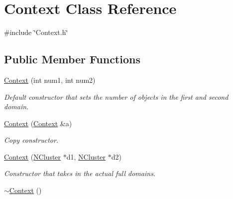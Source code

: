 \hypertarget{class_context}{
\section{Context Class Reference}
\label{class_context}
}


{\ttfamily \#include \char`\"{}Context.h\char`\"{}}

\subsection*{Public Member Functions}
\begin{DoxyCompactItemize}
\item 
\hyperlink{class_context_a7c09cf1cce283bf24fed475e7084c294}{Context} (int num1, int num2)
\begin{DoxyCompactList}\small\item\em Default constructor that sets the number of objects in the first and second domain. \item\end{DoxyCompactList}\item 
\hyperlink{class_context_ac0423f54b36186488e04d7723c52fee4}{Context} (\hyperlink{class_context}{Context} \&a)
\begin{DoxyCompactList}\small\item\em Copy constructor. \item\end{DoxyCompactList}\item 
\hyperlink{class_context_ae66f36043dcffe09e73765eed28eb782}{Context} (\hyperlink{class_n_cluster}{NCluster} $\ast$d1, \hyperlink{class_n_cluster}{NCluster} $\ast$d2)
\begin{DoxyCompactList}\small\item\em Constructor that takes in the actual full domains. \item\end{DoxyCompactList}\item 
\hypertarget{class_context_a2d34e4556448e40693f61d15e091b604}{
\hyperlink{class_context_a2d34e4556448e40693f61d15e091b604}{$\sim$Context} ()}
\label{class_context_a2d34e4556448e40693f61d15e091b604}


\end{DoxyCompactItemize}
